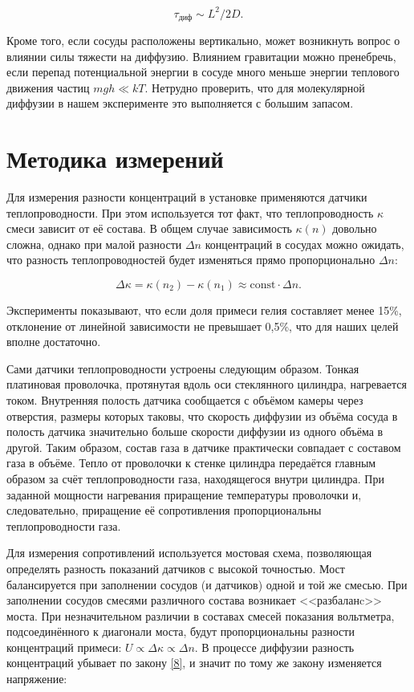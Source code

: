 \documentclass[a4paper, 12pt]{article}
\begin{document}
\begin{equation}\label{9}
\tau_\text{диф} \sim L^2/2D.
\end{equation}

Кроме того, если сосуды расположены вертикально, может возникнуть вопрос о влиянии силы тяжести на диффузию. Влиянием гравитации можно пренебречь, если перепад потенциальной энергии в сосуде много меньше энергии теплового движения частиц $ mgh \ll kT $. Нетрудно проверить, что для молекулярной диффузии в нашем эксперименте это выполняется с большим запасом.


\section{Методика измерений}

Для измерения разности концентраций в установке применяются датчики теплопроводности. При этом используется тот факт, что теплопроводность $ \kappa $ смеси зависит от её состава. В общем случае зависимость $ \kappa(n) $ довольно сложна, однако при малой разности $ \Delta n $ концентраций в сосудах можно ожидать, что разность теплопроводностей будет изменяться прямо пропорционально $ \Delta n $:

\[ \Delta \kappa = \kappa(n_2)-\kappa(n_1)\approx\text{const}\cdot\Delta n. \]

Эксперименты показывают, что если доля примеси гелия составляет менее
15\%, отклонение от линейной зависимости не превышает 0,5\%, что для наших целей вполне достаточно.

Сами датчики теплопроводности устроены следующим образом. Тонкая платиновая проволочка, протянутая вдоль оси стеклянного цилиндра, нагревается током. Внутренняя полость датчика сообщается с объёмом камеры через отверстия, размеры которых таковы, что скорость диффузии из объёма сосуда в полость датчика значительно больше скорости диффузии из одного объёма в другой. Таким образом, состав газа в датчике практически совпадает с составом газа в объёме. Тепло от проволочки к стенке цилиндра передаётся главным образом за счёт теплопроводности газа, находящегося внутри цилиндра. При заданной мощности нагревания приращение температуры проволочки и, следовательно, приращение её сопротивления пропорциональны теплопроводности газа.

Для измерения сопротивлений используется мостовая схема, позволяющая определять разность показаний датчиков с высокой точностью. Мост балансируется при заполнении сосудов (и датчиков) одной и той же смесью. При заполнении сосудов смесями различного состава возникает <<разбаланc>> моста. При незначительном различии в составах смесей показания вольтметра, подсоединённого к диагонали моста, будут пропорциональны разности концентраций примеси: $ U\propto\Delta\kappa\propto\Delta n $. В процессе диффузии разность концентраций убывает по закону \eqref{8}, и значит по тому же закону изменяется напряжение:
\end{document}
